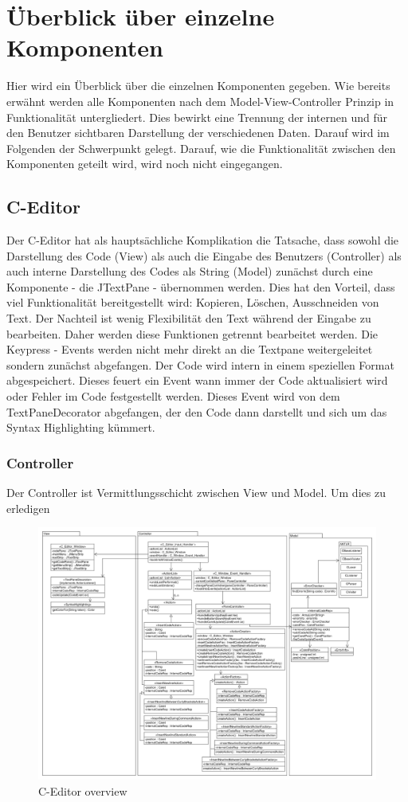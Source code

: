 \documentclass[a4paper]{scrreprt}
\begin{document}
\section{Überblick über einzelne Komponenten}
Hier wird ein Überblick über die einzelnen Komponenten gegeben. Wie bereits erwähnt werden alle Komponenten nach dem Model-View-Controller Prinzip in Funktionalität untergliedert. Dies bewirkt eine Trennung der internen und für den Benutzer sichtbaren Darstellung der verschiedenen Daten. Darauf wird im Folgenden der Schwerpunkt gelegt. Darauf, wie die Funktionalität zwischen den Komponenten geteilt wird, wird noch nicht eingegangen.

\subsection{C-Editor}
Der C-Editor hat als hauptsächliche Komplikation die Tatsache, dass sowohl die Darstellung des Code (View) als auch die Eingabe des Benutzers (Controller) als auch interne Darstellung des Codes als String (Model) zunächst durch eine Komponente - die JTextPane - übernommen werden. Dies hat den Vorteil, dass viel Funktionalität bereitgestellt wird: Kopieren, Löschen, Ausschneiden von Text. Der Nachteil ist wenig Flexibilität den Text während der Eingabe zu bearbeiten. Daher werden diese Funktionen getrennt bearbeitet werden. Die Keypress - Events werden nicht mehr direkt an die Textpane weitergeleitet sondern zunächst abgefangen. Der Code wird intern in einem speziellen Format abgespeichert. Dieses feuert ein Event wann immer der Code aktualisiert wird oder Fehler im Code festgestellt werden. Dieses Event wird von dem TextPaneDecorator abgefangen, der den Code dann darstellt und sich um das Syntax Highlighting kümmert. 
\subsubsection{Controller}
Der Controller ist Vermittlungsschicht zwischen View und Model. Um dies zu erledigen

\begin{figure}[H]
\includegraphics[scale=0.4, angle = 270]{CEditorMVC.png}
\caption{C-Editor overview}
\label{C-Editor-MVC-overview}
\end{figure}
\end{document}
